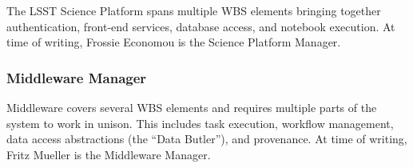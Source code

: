 The LSST Science Platform spans multiple WBS elements bringing together authentication, front-end services, database access, and notebook execution.
At time of writing, Frossie Economou is the Science Platform Manager.

\subsubsection{Middleware Manager}\label{role:mwlead}

Middleware covers several WBS elements and requires multiple parts of the system to work in unison.
This includes task execution, workflow management, data access abstractions (the ``Data Butler''), and provenance.
At time of writing, Fritz Mueller is the Middleware Manager.
